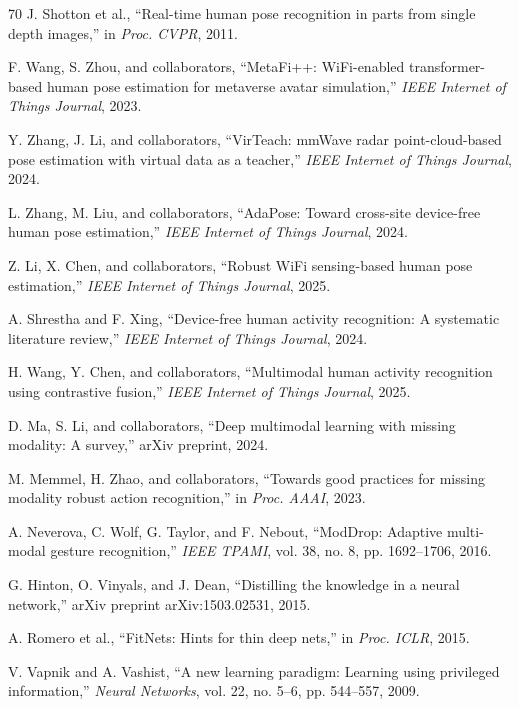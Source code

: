 \documentclass[journal]{IEEEtran}
\begin{document}
\begin{thebibliography}{70}
J. Shotton et al., ``Real-time human pose recognition in parts from single depth images,'' in \emph{Proc. CVPR}, 2011.

F. Wang, S. Zhou, and collaborators, ``MetaFi++: WiFi-enabled transformer-based human pose estimation for metaverse avatar simulation,'' \emph{IEEE Internet of Things Journal}, 2023.

Y. Zhang, J. Li, and collaborators, ``VirTeach: mmWave radar point-cloud-based pose estimation with virtual data as a teacher,'' \emph{IEEE Internet of Things Journal}, 2024.

L. Zhang, M. Liu, and collaborators, ``AdaPose: Toward cross-site device-free human pose estimation,'' \emph{IEEE Internet of Things Journal}, 2024.

Z. Li, X. Chen, and collaborators, ``Robust WiFi sensing-based human pose estimation,'' \emph{IEEE Internet of Things Journal}, 2025.

A. Shrestha and F. Xing, ``Device-free human activity recognition: A systematic literature review,'' \emph{IEEE Internet of Things Journal}, 2024.

H. Wang, Y. Chen, and collaborators, ``Multimodal human activity recognition using contrastive fusion,'' \emph{IEEE Internet of Things Journal}, 2025.

D. Ma, S. Li, and collaborators, ``Deep multimodal learning with missing modality: A survey,'' arXiv preprint, 2024.

M. Memmel, H. Zhao, and collaborators, ``Towards good practices for missing modality robust action recognition,'' in \emph{Proc. AAAI}, 2023.

A. Neverova, C. Wolf, G. Taylor, and F. Nebout, ``ModDrop: Adaptive multi-modal gesture recognition,'' \emph{IEEE TPAMI}, vol. 38, no. 8, pp. 1692--1706, 2016.

G. Hinton, O. Vinyals, and J. Dean, ``Distilling the knowledge in a neural network,'' arXiv preprint arXiv:1503.02531, 2015.

A. Romero et al., ``FitNets: Hints for thin deep nets,'' in \emph{Proc. ICLR}, 2015.

V. Vapnik and A. Vashist, ``A new learning paradigm: Learning using privileged information,'' \emph{Neural Networks}, vol. 22, no. 5--6, pp. 544--557, 2009.


\end{thebibliography}
\end{document}
